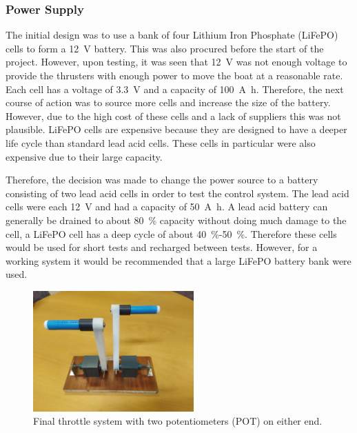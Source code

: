 		\subsubsection{Power Supply}
		The initial design was to use a bank of four Lithium Iron Phosphate (LiFePO) cells to form a \SI{12}{\volt} battery. This was also procured before the start of the project. However, upon testing, it was seen that \SI{12}{\volt} was not enough voltage to provide the thrusters with enough power to move the boat at a reasonable rate. Each cell has a voltage of \SI{3.3}{\volt} and a capacity of \SI{100}{\ampere\hour}. Therefore, the next course of action was to source more cells and increase the size of the battery. However, due to the high cost of these cells and a lack of suppliers this was not plausible. LiFePO cells are expensive because they are designed to have a deeper life cycle than standard lead acid cells. These cells in particular were also expensive due to their large capacity.\par 
		Therefore, the decision was made to change the power source to a battery consisting of two lead acid cells in order to test the control system. The lead acid cells were each \SI{12}{\volt} and had a capacity of \SI{50}{\ampere\hour}. A lead acid battery can generally be drained to about \SI{80}{\percent} capacity without doing much damage to the cell, a LiFePO cell has a deep cycle of about \SI{40}{\percent}-\SI{50}{\percent}. Therefore these cells would be used for short tests and recharged between tests. However, for a working system it would be recommended that a large LiFePO battery bank were used. 
		\begin{figure}[!ht]
			\begin{center}
				\includegraphics[width = 0.55\textwidth]{figures/throttle.jpg}
				\caption{Final throttle system with two potentiometers (POT) on either end.}
				\label{fig:3:throttle}
			\end{center}
		\end{figure}
